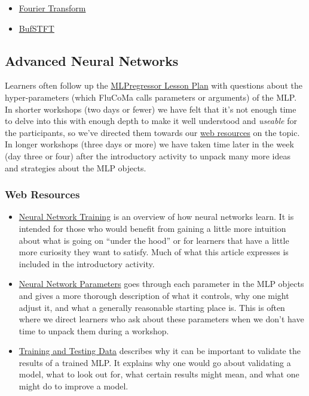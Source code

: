 \documentclass{article}
\providecommand{\tightlist}{%
  \setlength{\itemsep}{0pt}\setlength{\parskip}{0pt}}
\begin{document}
\begin{itemize}
\tightlist
\item
  \href{https://learn.flucoma.org/learn/fourier-transform/}{Fourier
  Transform}
\item
  \href{https://learn.flucoma.org/reference/bufstft/}{BufSTFT}
\end{itemize}

\subsection{Advanced Neural Networks}\label{advanced-neural-networks}

Learners often follow up the \hyperref[example-lesson-plan]{MLPregressor Lesson Plan} with questions about the hyper-parameters (which FluCoMa calls
parameters or arguments) of the MLP. In shorter workshops (two days or
fewer) we have felt that it's not enough time to delve into this with
enough depth to make it well understood and \emph{useable} for the
participants, so we've directed them towards our
\href{https://learn.flucoma.org/learn/mlp-parameters/}{web resources} on
the topic. In longer workshops (three days or more) we have taken time
later in the week (day three or four) after the introductory activity to
unpack many more ideas and strategies about the MLP objects.

\subsubsection{Web Resources}

\begin{itemize}
\tightlist
\item
  \href{https://learn.flucoma.org/learn/mlp-training/}{Neural Network
  Training} is an overview of how neural networks learn. It is intended
  for those who would benefit from gaining a little more intuition about
  what is going on ``under the hood'' or for learners that have a little
  more curiosity they want to satisfy. Much of what this article expresses is included in the introductory activity.
\item
  \href{https://learn.flucoma.org/learn/mlp-parameters/}{Neural Network
  Parameters} goes through each parameter in the MLP objects and gives a
  more thorough description of what it controls, why one might adjust
  it, and what a generally reasonable starting place is. This is often
  where we direct learners who ask about these parameters when we don't
  have time to unpack them during a workshop.
\item
  \href{https://learn.flucoma.org/learn/training-testing-split/}{Training
  and Testing Data} describes why it can be important to validate the
  results of a trained MLP. It explains why one would go about
  validating a model, what to look out for, what certain results might
  mean, and what one might do to improve a model.
\end{itemize}
\end{document}
